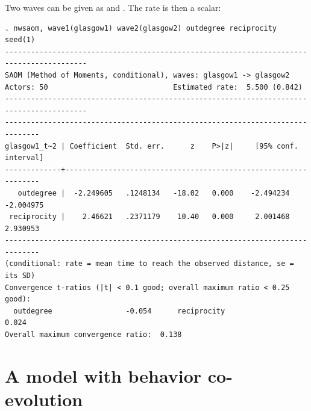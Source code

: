 Two waves can be given as  and . The rate is then a scalar:
\begin{lstlisting}
. nwsaom, wave1(glasgow1) wave2(glasgow2) outdegree reciprocity seed(1)
-----------------------------------------------------------------------------------------
SAOM (Method of Moments, conditional), waves: glasgow1 -> glasgow2
Actors: 50                             Estimated rate:  5.500 (0.842)
-----------------------------------------------------------------------------------------
------------------------------------------------------------------------------
glasgow1_t~2 | Coefficient  Std. err.      z    P>|z|     [95% conf. interval]
-------------+----------------------------------------------------------------
   outdegree |  -2.249605   .1248134   -18.02   0.000    -2.494234   -2.004975
 reciprocity |    2.46621   .2371179    10.40   0.000     2.001468    2.930953
------------------------------------------------------------------------------
(conditional: rate = mean time to reach the observed distance, se = its SD)
Convergence t-ratios (|t| < 0.1 good; overall maximum ratio < 0.25 good):
  outdegree                 -0.054      reciprocity                0.024
Overall maximum convergence ratio:  0.138
\end{lstlisting}

\section{A model with behavior co-evolution}

